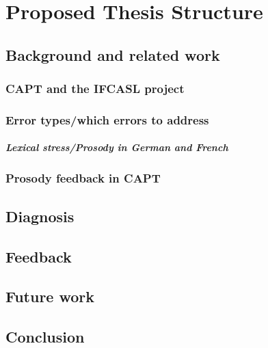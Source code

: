 \Blindtext[1][2]

\chapter{Proposed Thesis Structure}
\label{chap:structure}
\blindtext 

\section{Background and related work}
\blindtext

\subsection{CAPT and the IFCASL project}
\blindtext

\subsection{Error types/which errors to address}
\blindtext

\paragraph{Lexical stress/Prosody in German and French}
\blindtext

\subsection{Prosody feedback in CAPT}
\blindtext

\section{Diagnosis}
\blindtext

\section{Feedback}
\blindtext

\section{Future work}
\blindtext

\section{Conclusion}
\blindtext

%
%
%
%
